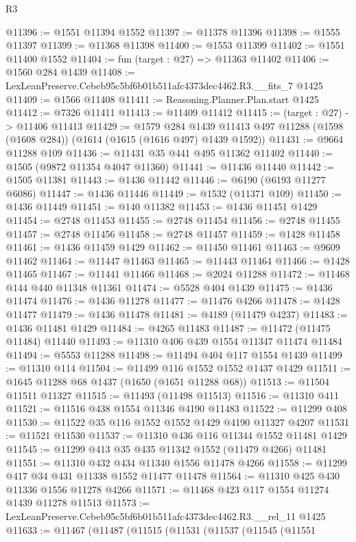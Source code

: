 \begin{lexlean}{R3}
\begin{coremodule}
@11396 := @1551 @11394 @1552
@11397 := @11378 @11396
@11398 := @1555 @11397
@11399 := @11368 @11398
@11400 := @1553 @11399
@11402 := @1551 @11400 @1552
@11404 := fun (target : @27) => @11363 @11402
@11406 := @1560 @284 @1439
@11408 := LexLeanPreserve.Cebeb95c5bf6b01b511afc4373dec4462.R3.__fits_7 @1425
@11409 := @1566 @11408
@11411 := Reasoning.Planner.Plan.start @1425
@11412 := @7326 @11411
@11413 := @11409 @11412
@11415 := (target : @27) -> @11406 @11413
@11429 := @1579
    @284
    @1439
    @11413
    @497
    @11288
    (@1598 (@1608 @284))
    (@1614 (@1615 (@1616 @497) @1439 @1592))
@11431 := @9664 @11288 @109
@11436 := @11431 @35 @441 @495 @11362 @11402
@11440 := @1505 (@9872 @11354 @4047 @11360)
@11441 := @11436 @11440
@11442 := @1505 @11381
@11443 := @1436 @11442
@11446 := @6190 (@6193 @11277 @6086)
@11447 := @1436 @11446
@11449 := @1532 (@11371 @109)
@11450 := @1436 @11449
@11451 := @140 @11382
@11453 := @1436 @11451 @1429
@11454 := @2748 @11453
@11455 := @2748 @11454
@11456 := @2748 @11455
@11457 := @2748 @11456
@11458 := @2748 @11457
@11459 := @1428 @11458
@11461 := @1436 @11459 @1429
@11462 := @11450 @11461
@11463 := @9609 @11462
@11464 := @11447 @11463
@11465 := @11443 @11464
@11466 := @1428 @11465
@11467 := @11441 @11466
@11468 := @2024 @11288
@11472 := @11468 @144 @440 @11348 @11361
@11474 := @5528 @404 @1439
@11475 := @1436 @11474
@11476 := @1436 @11278
@11477 := @11476 @4266
@11478 := @1428 @11477
@11479 := @1436 @11478
@11481 := @4189 (@11479 @4237)
@11483 := @1436 @11481 @1429
@11484 := @4265 @11483
@11487 := @11472 (@11475 @11484) @11440
@11493 := @11310 @406 @439 @1554 @11347 @11474 @11484
@11494 := @5553 @11288
@11498 := @11494 @404 @117 @1554 @1439
@11499 := @11310 @114
@11504 := @11499 @116 @1552 @1552 @1437 @1429
@11511 := @1645 @11288 @68 @1437 (@1650 (@1651 @11288 @68))
@11513 := @11504 @11511 @11327
@11515 := @11493 (@11498 @11513)
@11516 := @11310 @411
@11521 := @11516 @438 @1554 @11346 @4190 @11483
@11522 := @11299 @408
@11530 := @11522 @35 @116 @1552 @1552 @1429 @4190 @11327 @4207
@11531 := @11521 @11530
@11537 := @11310 @436 @116 @11344 @1552 @11481 @1429
@11545 := @11299 @413 @35 @435 @11342 @1552 (@11479 @4266) @11481
@11551 := @11310 @432 @434 @11340 @1556 @11478 @4266
@11558 := @11299 @417 @34 @431 @11338 @1552 @11477 @11478
@11564 := @11310 @425 @430 @11336 @1556 @11278 @4266
@11571 := @11468 @423 @117 @1554 @11274 @1439 @11278 @11513
@11573 := LexLeanPreserve.Cebeb95c5bf6b01b511afc4373dec4462.R3.__rel_11 @1425
@11633 := @11467
    (@11487
      (@11515
        (@11531
          (@11537
            (@11545
              (@11551

\end{coremodule}
\end{lexlean}
